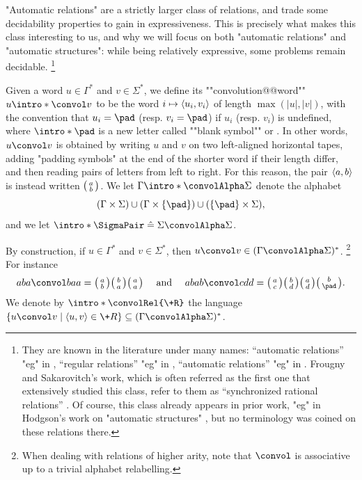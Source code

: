 "Automatic relations" are a strictly larger class of relations,
and trade some decidability properties to gain in expressiveness.
This is precisely what makes this class interesting to us, and why we will focus
on both "automatic relations" and "automatic structures": while being relatively
expressive, some problems remain decidable.%
\footnote{They are known in the literature under many names:
``automatic relations''
	"eg" in \cite[Definition~2.3]{CartonChoffrutGrigorieff2006DecisionProblems},
``regular relations''
	"eg" in \cite[Definition~2.2]{KhoussainovNerode1995AutomaticPresentations},
``automatic relations''
	"eg" in \cite[\S~2.1]{LodingSpinrath2019DecisionProblems}.
Frougny and Sakarovitch's work, which is often referred as the first one
that extensively studied this class, refer to them as ``synchronized rational relations''
\cite[\S~4]{FrougnySakarovitch1993SynchronizedRationalRelations}.
Of course, this class already appears in prior work, "eg" in Hodgson's work on
"automatic structures" \cite{Hodgson1983Decidabilite}, but no terminology was coined on these relations there.}

Given a word $u \in \Gamma^*$ and $v\in \Sigma^*$, we define
its \AP""convolution@@word"" $u \intro*\convol v$ to be the word
$i \mapsto \langle u_i, v_i\rangle$ of length $\max{(|u|,|v|)}$,
with the convention that $u_i = \pad$ (resp. $v_i = \pad$)
if $u_i$ (resp. $v_i$) is undefined, where $\intro*\pad$ is a new letter called
""blank symbol"" or . In other words,
$u \convol v$ is obtained by writing $u$ and $v$ on two left-aligned horizontal tapes,
adding "padding symbols" at the end of the shorter word if their length differ,
and then reading pairs of letters from left to right.
For this reason, the pair $\langle a,b\rangle$ is instead written $\pair{a}{b}$.
We let \AP$\Gamma \intro*\convolAlpha \Sigma$ denote the alphabet
\[(\Gamma \times \Sigma) \cup (\Gamma \times \{\pad\}) \cup (\{\pad\} \times \Sigma),\]
and we let $\intro*\SigmaPair \defeq \Sigma \convolAlpha \Sigma$.

By construction, if $u \in \Gamma^*$ and $v\in \Sigma^*$, then $u\convol v \in (\Gamma\convolAlpha\Sigma)^*$.%
\footnote{When dealing with relations of higher arity, note that $\convol$ is associative up to a trivial
alphabet relabelling.}
For instance
\[
	aba \convol baa = \pair{a}{b}\pair{b}{a}\pair{a}{a}
	\quad\text{ and }\quad
	abab \convol cdd = \pair{a}{c}\pair{b}{d}\pair{a}{d}\pair{b}{\pad}.
\]
We denote by \AP$\intro*\convolRel{\+R}$ the language
$\{ u \convol v \mid \tup{u,v} \in \+R\} \subseteq (\Gamma\convolAlpha\Sigma)^*$.

